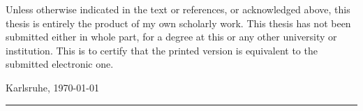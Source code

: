 
Unless otherwise indicated in the text or references, or acknowledged
above, this thesis is entirely the product of my own scholarly work. This
thesis has not been submitted either in whole part, for a degree at this
or any other university or institution. This is to certify that the printed
version is equivalent to the submitted electronic one.

Karlsruhe, \today \\[4ex]


\rule[-0.2cm]{5cm}{0.5pt} \\

\textsc{\autor} \\[10ex]
